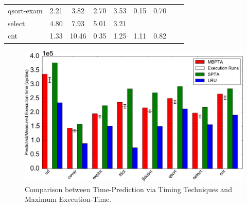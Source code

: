 \begin{table}[tb!]
{\begin{tabular}{lcccccccccccccc}
qsort-exam & \multicolumn{2}{c}{2.21} & \multicolumn{2}{c}{3.82} &
\multicolumn{2}{c}{2.70}&\multicolumn{2}{c}{3.53}
& \multicolumn{2}{c}{0.15}
& \multicolumn{2}{c}{0.70}
 \\ 

select     & \multicolumn{2}{c}{4.80} & \multicolumn{2}{c}{7.93} &
\multicolumn{2}{c}{5.01}&\multicolumn{2}{c}{3.21} 
& \multicolumn{2}{c}{\color{red}{0.88}}
& \multicolumn{2}{c}{\color{red}{0.62}}

\\


cnt        & \multicolumn{2}{c}{1.33} & \multicolumn{2}{c}{10.46} &
\multicolumn{2}{c}{0.35} & \multicolumn{2}{c}{1.25} 
& \multicolumn{2}{c}{1.11}
& \multicolumn{2}{c}{0.82}
\\
\bottomrule
\end{tabular}
}
\end{table}




\begin{figure}[tb!]
\centering
\includegraphics[scale=0.4]{figures/comparison.pdf}
\caption{Comparison between Time-Prediction via Timing Techniques and Maximum Execution-Time.}
\label{comparison}
\end{figure}

